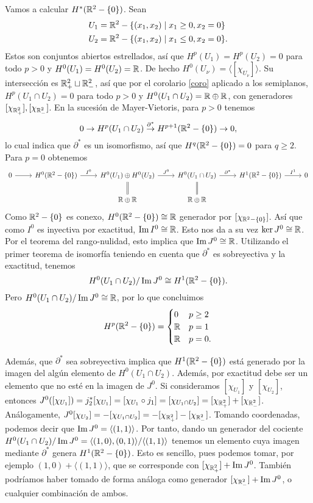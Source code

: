 \documentclass[CV.tex]{subfiles}
\begin{document}
\begin{ej}
Vamos a calcular $H^*(\mathbb{R}^2-\{0\})$. Sean
\begin{align*}
&U_1=\mathbb{R}^2-\{(x_1,x_2)\mid x_1\geq 0, x_2=0\}\\
&U_2=\mathbb{R}^2-\{(x_1,x_2)\mid x_1\leq 0, x_2=0\}.
\end{align*}
Estos son conjuntos abiertos estrellados, así que $H^p(U_1)=H^p(U_2)=0$ para todo $p>0$ y $H^0(U_1)=H^0(U_2)=\mathbb{R}$. De hecho $H^0(U_{\nu})=\langle [\chi_{U_{\nu}}]\rangle$. Su intersección es $\mathbb{R}^2_+\sqcup\mathbb{R}^2_-$, así que por el corolario \ref{coro} aplicado a los semiplanos, $H^p(U_1\cap U_2)=0$ para todo $p>0$ y $H^0(U_1\cap U_2)=\mathbb{R}\oplus\mathbb{R}$, con generadores $[\chi_{\mathbb{R}^2_+}],[\chi_{\mathbb{R}^2_-}]$. En la sucesión de Mayer-Vietoris, para $p>0$ tenemos
\[
0\to H^p(U_1\cap U_2)\overset{\partial^*}{\to} H^{p+1}(\mathbb{R}^2-\{0\})\to 0,
\]
lo cual indica que $\partial^*$ es un isomorfismo, así que $H^{q}(\mathbb{R}^2-\{0\})=0$ para $q\geq 2$. Para $p=0$ obtenemos
\[
\begin{tikzcd}
0\arrow[r] & H^0(\R^2-\{0\})\arrow[r,"I^0"] & H^0(U_1)\oplus H^0(U_2)\arrow[r, "J^0"]\arrow[d,equals] & H^0(U_1\cap U_2)\arrow[r,"\partial^*"]\arrow[d, equals] & H^1(\R^2-\{0\})\arrow[r,"I^1"] & 0\\
 & & \R\oplus\R &\R\oplus\R & & 
\end{tikzcd}
\]
Como $\mathbb{R}^2-\{0\}$ es conexo, $H^0(\mathbb{R}^2-\{0\})\cong\mathbb{R}$ generador por $[\chi_{\mathbb{R}^2-\{0\}}]$. Así que como $I^0$ es inyectiva por exactitud, $\operatorname{Im}{I^0}\cong\mathbb{R}$. Esto nos da a su vez $\ker{J^0}\cong\mathbb{R}$. Por el teorema del rango-nulidad, esto implica que $\operatorname{Im}{J^0}\cong\mathbb{R}$. Utilizando el primer teorema de isomorfía teniendo en cuenta que $\partial^*$ es sobreyectiva y la exactitud, tenemos
\[
H^0(U_1\cap U_2)/\operatorname{Im}{J^0}\cong H^1(\mathbb{R}^2-\{0\}).
\]
Pero $H^0(U_1\cap U_2)/\operatorname{Im}{J^0}\cong\mathbb{R}$, por lo que concluimos
\[
H^p(\mathbb{R}^2-\{0\})=\begin{cases}
0 & p\geq 2\\
\mathbb{R} & p=1\\
\mathbb{R} & p=0.
\end{cases}
\]

Además, que $\partial^*$ sea sobreyectiva implica que $H^1(\mathbb{R}^2-\{0\})$ está generado por la imagen del algún elemento de $H^0(U_1\cap U_2)$. Además, por exactitud debe ser un elemento que no esté en la imagen de $J^0$. Si consideramos $[\chi_{U_1}]$ y $[\chi_{U_2}]$, entonces $J^0([\chi_{U_1}])=j_2^*[\chi_{U_1}]=[\chi_{U_1}\circ j_1]=[\chi_{U_1\cap U_2}]=[\chi_{\mathbb{R}^2_+}]+[\chi_{\mathbb{R}^2_-}]$. Análogamente, $J^0[\chi_{U_2}]=-[\chi_{U_1\cap U_2}]=-[\chi_{\mathbb{R}^2_+}]-[\chi_{\mathbb{R}^2_-}]$. Tomando coordenadas, podemos decir que $\operatorname{Im}{J^0}=\langle (1,1)\rangle$. Por tanto, dando un generador del cociente $H^0(U_1\cap U_2)/\operatorname{Im}{J^0}=\langle (1,0),(0,1)\rangle/\langle (1,1)\rangle$ tenemos un elemento cuya imagen mediante $\partial^*$ genera $H^1(\mathbb{R}^2-\{0\})$. Esto es sencillo, pues podemos tomar, por ejemplo $(1,0)+\langle (1,1)\rangle$, que se corresponde con $[\chi_{\mathbb{R}^2_+}]+\operatorname{Im}{J^0}$. También podríamos haber tomado de forma análoga como generador $[\chi_{\mathbb{R}^2_-}]+\operatorname{Im}{J^0}$, o cualquier combinación de ambos.
\end{ej}
\end{document}
